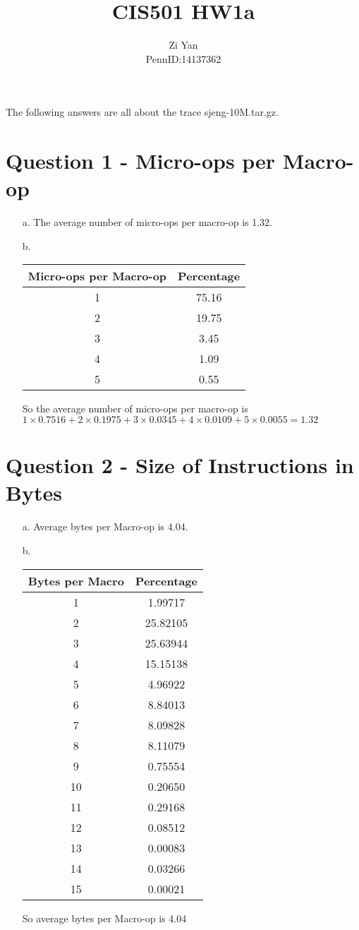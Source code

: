 \documentclass[12pt,letterpaper]{article}
\author{Zi Yan\\PennID:14137362}
\title{CIS501 HW1a}
\date{}
\begin{document}
\maketitle

The following answers are all about the trace sjeng-10M.tar.gz.

 \section*{Question 1 - Micro-ops per Macro-op}
 \begin{itemize}
     \item[a.] The average number of micro-ops per macro-op is 1.32.
    
     \item[b.] 
\begin{tabular}{|c|c|}
\hline 
Micro-ops per Macro-op & Percentage\\
\hline
1 & 75.16 \\ 
\hline 
2 & 19.75 \\ 
\hline 
3 & 3.45 \\ 
\hline 
4 & 1.09 \\ 
\hline 
5 & 0.55 \\ 
\hline 
\end{tabular} 

So the average number of micro-ops per macro-op is 
$1\times 0.7516 + 2 \times 0.1975 + 3 \times 0.0345 + 4 \times
 0.0109 + 5 \times 0.0055 = 1.32$
 \end{itemize}
 \section*{Question 2 - Size of Instructions in Bytes}
 \begin{itemize}
     \item[a.] Average bytes per Macro-op is 4.04.
     \item[b.]
     \begin{tabular}{|c|c|}
\hline 
Bytes per Macro & Percentage \\ 
\hline 
1 & 1.99717 \\ 
\hline 
2 & 25.82105 \\ 
\hline 
3 & 25.63944 \\ 
\hline 
4 & 15.15138 \\ 
\hline 
5 & 4.96922 \\ 
\hline 
6 & 8.84013 \\ 
\hline 
7 & 8.09828 \\ 
\hline 
8 & 8.11079 \\ 
\hline 
9 & 0.75554 \\ 
\hline 
10 & 0.20650 \\ 
\hline 
11 & 0.29168 \\ 
\hline 
12 & 0.08512 \\ 
\hline 
13 & 0.00083 \\ 
\hline 
14 & 0.03266 \\ 
\hline 
15 & 0.00021 \\ 
\hline 
\end{tabular} 

So average bytes per Macro-op is 4.04
 \end{itemize}
\end{document}
